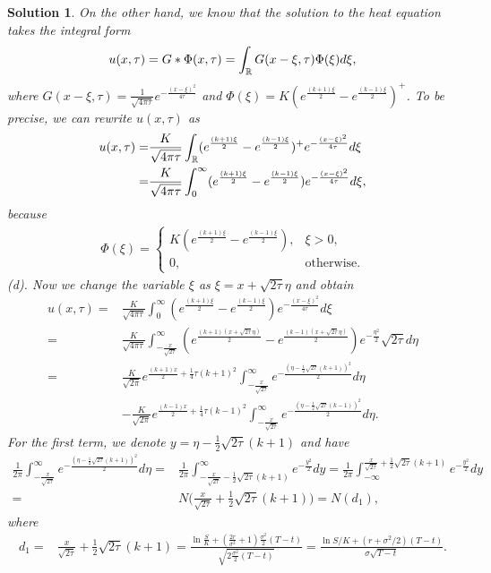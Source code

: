 \documentclass[6pt]{article}
\newtheorem{solution}{Solution}
\numberwithin{equation}{section}
\def\mathbb{\Bbb}
\begin{document}
\begin{enumerate}
\begin{solution}
On the other hand, we know that the solution to the heat equation takes the integral form
\begin{align*}
u(x,\tau)=G\ast \Phi (x,\tau)=\int_{\mathbb{R}}G(x-\xi,\tau)\Phi(\xi)d\xi,
\end{align*}
where $G(x-\xi,\tau)=\frac{1}{\sqrt{4\pi \tau}}e^{-\frac{(x-\xi)^2}{4\tau}}$ and $\Phi(\xi)=K(e^{\frac{(k+1)\xi}{2}}-e^{\frac{(k-1)\xi}{2}})^{+}$.
To be precise, we can rewrite $u(x,\tau)$ as
\begin{align*}
u(x,\tau)=&\frac{K}{\sqrt{4\pi \tau}}\int_{\mathbb{R}}(e^{\frac{(k+1)\xi}{2}}-e^{\frac{(k-1)\xi}{2}})^{+}e^{-\frac{(x-\xi)^2}{4\tau}}d\xi \\
=& \frac{K}{\sqrt{4\pi \tau}}\int_{0}^{\infty}(e^{\frac{(k+1)\xi}{2}}-e^{\frac{(k-1)\xi}{2}})e^{-\frac{(x-\xi)^2}{4\tau}}d\xi,
\end{align*}
because
\begin{align*}
\Phi(\xi)=
\begin{cases}
K(e^{\frac{(k+1)\xi}{2}}-e^{\frac{(k-1)\xi}{2}}),&\xi>0,\\
0,&\text{otherwise}.
\end{cases}
\end{align*}
(d).  Now we change the variable $\xi$ as $\xi=x+\sqrt{2\tau}\eta$ and obtain
\begin{align*}
u(x,\tau)=&\frac{K}{\sqrt{4\pi \tau}}\int_{0}^{\infty}(e^{\frac{(k+1)\xi}{2}}-e^{\frac{(k-1)\xi}{2}})e^{-\frac{(x-\xi)^2}{4\tau}}d\xi\\
=&\frac{K}{\sqrt{4\pi \tau}}\int_{-\frac{x}{\sqrt{2\tau}}}^{\infty}(e^{\frac{(k+1)(x+\sqrt{2\tau}\eta)}{2}}-e^{\frac{(k-1)(x+\sqrt{2\tau}\eta)}{2}})e^{-\frac{\eta^2}{2}}\sqrt{2\tau}d\eta \\
=&\frac{K}{\sqrt{2\pi}}e^{\frac{(k+1)x}{2}+\frac{1}{4}\tau(k+1)^2}\int_{-\frac{x}{\sqrt{2\tau}}}^{\infty}e^{-\frac{(\eta-\frac{1}{2}\sqrt{2\tau}(k+1))^2}{2}}d\eta\\
&-\frac{K}{\sqrt{2\pi}}e^{\frac{(k-1)x}{2}+\frac{1}{4}\tau(k-1)^2}\int_{-\frac{x}{\sqrt{2\tau}}}^{\infty}e^{-\frac{(\eta-\frac{1}{2}\sqrt{2\tau}(k-1))^2}{2}}d\eta.
\end{align*}
For the first term, we denote $y=\eta-\frac{1}{2}\sqrt{2\tau}(k+1)$ and have
\begin{align*}
\frac{1}{2\pi}\int_{-\frac{x}{\sqrt{2\tau}}}^{\infty}e^{-\frac{(\eta-\frac{1}{2}\sqrt{2\tau}(k+1))^2}{2}}d\eta=&\frac{1}{2\pi}\int_{-\frac{x}{\sqrt{2\tau}}-\frac{1}{2}\sqrt{2\tau}(k+1)}^{\infty}e^{-\frac{y^2}{2}}dy=\frac{1}{2\pi}\int^{\frac{x}{\sqrt{2\tau}}+\frac{1}{2}\sqrt{2\tau}(k+1)}_{-\infty}e^{-\frac{y^2}{2}}dy \quad  \\
=&N\Big(\frac{x}{\sqrt{2\tau}}+\frac{1}{2}\sqrt{2\tau}(k+1)\Big)=N(d_1),
\end{align*}
where
\begin{align*}
d_1=&\frac{x}{\sqrt{2\tau}}+\frac{1}{2}\sqrt{2\tau}(k+1)=\frac{\ln{\frac{S}{K}}+(\frac{2r}{\sigma^2}+1)\frac{\sigma^2}{2}(T-t)}{\sqrt{2\frac{\sigma^2}{2}(T-t)}}=\frac{\ln S/K +(r+\sigma^2/2)(T-t)}{\sigma \sqrt {T-t}}.
\end{align*}



\end{solution}
\end{enumerate}
\end{document}
